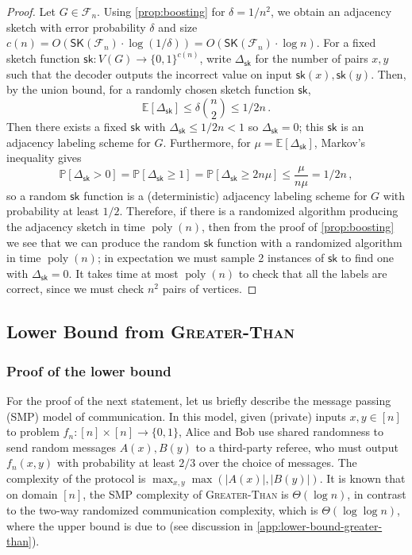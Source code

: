 \documentclass{theoretics}
\DeclareMathOperator{\poly}{poly}
\newcommand{\Ex}[1]{\bE \left[ #1 \right]}
\renewcommand{\Pr}[1]{\bP \left[ #1 \right]} %
\newcommand{\zo}{\{0,1\}}
\newcommand{\cF}{\ensuremath{\mathcal{F}}}
\newcommand{\bE}{\ensuremath{\mathbb{E}}}
\newcommand{\bP}{\ensuremath{\mathbb{P}}}
\newcommand{\sk}{\mathsf{sk}}
\newcommand{\RL}{\mathsf{SK}}
\begin{document}
\propderandomization*
\begin{proof}
Let $G \in \cF_n$.  Using \cref{prop:boosting} for $\delta = 1/n^2$, we obtain an
adjacency sketch with error probability $\delta$ and size $c(n) = O(\RL(\cF_n) \cdot
\log(1/\delta)) = O(\RL(\cF_n) \cdot \log n)$. For a fixed sketch function $\sk : V(G) \to
\zo^{c(n)}$, write $\Delta_\sk$ for the number of pairs $x,y$ such that the decoder outputs the incorrect
value on input $\sk(x),\sk(y)$. Then, by the union bound, for a randomly chosen sketch function $\sk$,
\[
  \Ex{\Delta_\sk} \leq \delta \binom{n}{2} \leq 1/2n \,.
\]
Then there exists a fixed $\sk$ with $\Delta_\sk \leq 1/2n < 1$ so $\Delta_\sk = 0$; this $\sk$
is an adjacency labeling scheme for $G$. Furthermore, for $\mu = \Ex{\Delta_\sk}$, Markov's inequality gives
\[
  \Pr{ \Delta_\sk > 0 } = \Pr{ \Delta_\sk \geq 1 } = \Pr{ \Delta_\sk \geq 2n \mu}
  \leq \frac{\mu}{n \mu} = 1/2n \,,
\]
so a random $\sk$ function is a (deterministic) adjacency labeling scheme for $G$ with probability
at least $1/2$. Therefore, if there is a randomized algorithm producing the adjacency sketch in time
$\poly(n)$, then from the proof of \cref{prop:boosting} we see that we can produce the random $\sk$
function with a randomized algorithm in time $\poly(n)$; in expectation we  must sample 2 instances of $\sk$
to find one with $\Delta_\sk = 0$. It takes time at most $\poly(n)$ to check that all the labels are
correct, since we must check $n^2$ pairs of vertices.
\end{proof}

\subsection{Lower Bound from \textsc{Greater-Than}}
\label{section:greater-than-lb}
\subsubsection{Proof of the lower bound}

For the proof of the next statement, let us briefly describe the message passing (SMP) model of
communication.  In this model, given (private) inputs $x,y \in [n]$ to problem $f_n : [n] \times [n]
\to \zo$, Alice and Bob use shared randomness to send random messages $A(x),B(y)$ to a third-party
referee, who must output $f_n(x,y)$ with probability at least $2/3$ over the choice of messages. The
complexity of the protocol is $\max_{x,y} \max(|A(x)|, |B(y)|)$. It is known that on domain $[n]$,
the SMP complexity of \textsc{Greater-Than} is $\Theta(\log n)$, in contrast to the two-way
randomized communication complexity, which is $\Theta(\log\log n)$, where the upper bound is due to
\cite{Nis93} (see discussion in \cref{app:lower-bound-greater-than}).
\end{document}
